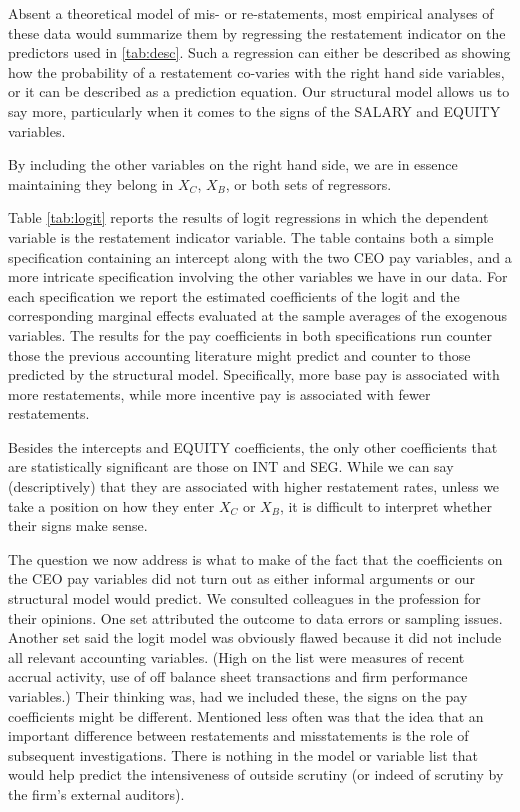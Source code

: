 Absent a theoretical model of mis- or re-statements, most empirical analyses of these data would summarize them by regressing the restatement indicator on the predictors used in \ref{tab:desc}.
Such a regression can either be described as showing how the probability of a restatement co-varies with the right hand side variables, or it can be described as a prediction equation.
Our structural model allows us to say more, particularly when it comes to the signs of the SALARY and EQUITY variables.

By including the other variables on the right hand side, we are in essence maintaining they belong in $X_C$, $X_B$, or both sets of regressors.

Table \ref{tab:logit} reports the results of logit regressions in which the dependent variable is the restatement indicator variable. 
The table contains both a simple specification containing an intercept along with the two CEO pay variables,  and a more intricate specification involving the other variables we have in our data.
For each specification we report the estimated coefficients of the logit and the  corresponding marginal effects evaluated at the sample averages of the exogenous variables.%
The results for the pay coefficients in both specifications run counter those the previous accounting literature might predict and counter to those predicted by the structural model.
Specifically,  more base pay is associated with more restatements, while more incentive pay is associated with fewer restatements.

Besides the intercepts and EQUITY coefficients, the only other coefficients that are statistically significant are those on INT and SEG.
While we can say (descriptively) that they are associated with higher restatement rates, unless we take a position on how they enter $X_C$ or $X_B$, it is difficult to interpret whether their signs make sense.

The question we now address is what to make of the fact that the coefficients on the CEO pay variables did not turn out as either informal arguments or our structural model would predict. 
We consulted colleagues in the profession for their opinions. 
One set attributed the outcome to data errors or sampling issues. 
Another set said the logit model was obviously flawed because it did not include all relevant accounting variables. (High on the list were measures
of recent accrual activity, use of off balance sheet transactions and firm
performance variables.) 
Their thinking was, had we included these, the signs on the pay coefficients might be different. 
Mentioned less often was that the idea that an important difference between restatements and misstatements is the role of subsequent investigations. 
There is nothing in the model or variable list that would help predict  the intensiveness of outside scrutiny (or indeed of scrutiny by the firm's external auditors).

